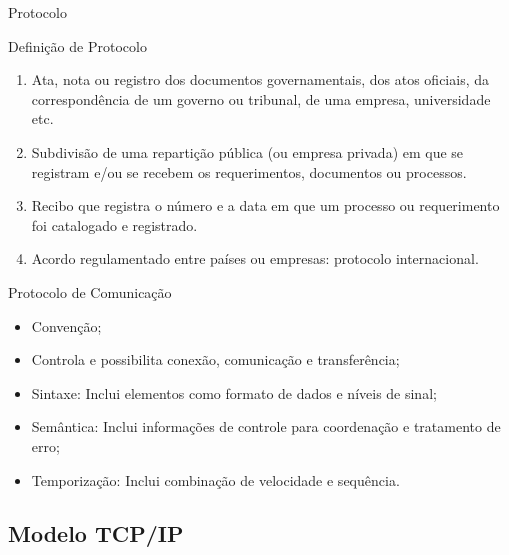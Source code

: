 \begin{frame}{Protocolo}
	\begin{block}{Definição de Protocolo}
		\begin{enumerate}
			\item Ata, nota ou registro dos documentos governamentais, dos 
			atos oficiais, da correspondência de um governo ou tribunal, de uma 
			empresa, universidade etc.
			\item Subdivisão de uma repartição pública (ou empresa privada) em 
			que se registram e/ou se recebem os requerimentos, documentos ou 
			processos.
			\item Recibo que registra o número e a data em que um processo ou 
			requerimento foi catalogado e registrado.
			\item Acordo regulamentado entre países ou empresas: protocolo 
			internacional.
		\end{enumerate}
	\end{block}
\end{frame}


\begin{frame}{Protocolo de Comunicação}
\begin{itemize}
\item Convenção; \pause
\item Controla e possibilita conexão, comunicação e transferência; \pause
\item Sintaxe: Inclui elementos como formato de dados e níveis de sinal; \pause
\item Semântica: Inclui informações de controle para coordenação e 
tratamento de erro; \pause
\item Temporização: Inclui combinação de velocidade e sequência. \pause
\end{itemize}
\end{frame}

\subsection{Modelo TCP/IP}

